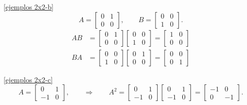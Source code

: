 \begin{enumerate}[topsep=6pt,itemsep=.4cm]
\ref{ejemplos 2x2-b}
 \begin{equation*}
    A = \begin{bmatrix}
        0 & 1\\ 0 & 0
        \end{bmatrix}, \qquad B = 
        \begin{bmatrix}
        0 & 0\\ 1 & 0
        \end{bmatrix}.
\end{equation*}
\begin{align*}
    AB &= \begin{bmatrix}
        0 & 1\\ 0 & 0
        \end{bmatrix} \begin{bmatrix}
            0 & 0\\ 1 & 0
            \end{bmatrix} = \begin{bmatrix}
                1 & 0\\ 0 & 0
                \end{bmatrix} \\
    BA &=  
        \begin{bmatrix}
        0 & 0\\ 1 & 0
        \end{bmatrix}
        \begin{bmatrix}
        0 & 1\\ 0 & 0
        \end{bmatrix} = \begin{bmatrix}
        0 & 0\\ 0 & 1
        \end{bmatrix} 
\end{align*}

\ref{ejemplos 2x2-c}
 \begin{equation*}
    A = \begin{bmatrix}
        0 & 1\\ -1 & 0
        \end{bmatrix}, \qquad \Rightarrow \qquad A^2 = 
        \begin{bmatrix}
            0 & 1\\ -1 & 0
            \end{bmatrix}
            \begin{bmatrix}
                0 & 1\\ -1 & 0
                \end{bmatrix}
            = \begin{bmatrix}
                -1 & 0\\ 0 & -1
                \end{bmatrix}.
\end{equation*}


\end{enumerate}
